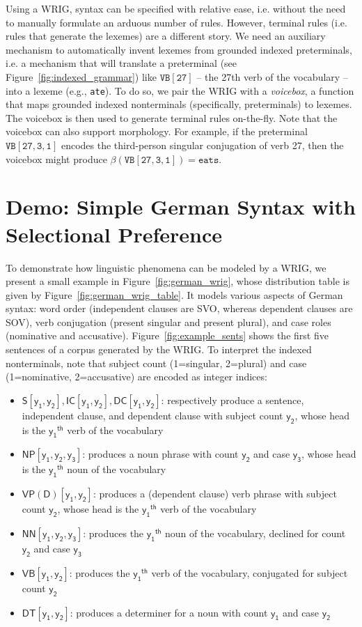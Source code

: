 \documentclass[11pt]{article}
\renewcommand{\bnfpn}[1]{\mathsf{#1}}
\renewcommand{\bnfts}[1]{\mathtt{#1}}
\begin{document}
Using a WRIG, syntax can be specified with relative ease, i.e. without the need to manually formulate an arduous number of rules. However, terminal rules (i.e. rules that generate the lexemes) are a different story. We need an auxiliary mechanism to automatically invent lexemes from grounded indexed preterminals, i.e. a mechanism that will translate a preterminal (see Figure~\ref{fig:indexed_grammar}) like $\bnfts{VB[27]}$ -- the 27th verb of the vocabulary -- into a lexeme (e.g., \texttt{ate}). To do so, we pair the WRIG with a \emph{voicebox}, a function that maps grounded indexed nonterminals (specifically, preterminals) to lexemes. The voicebox is then used to generate terminal rules on-the-fly. Note that the voicebox can also support morphology. For example, if the preterminal $\bnfts{VB[27, 3, 1]}$ encodes the third-person singular conjugation of verb 27, then the voicebox might produce $\beta(\bnfts{VB[27, 3, 1]}) = \texttt{eats}$.


\section{Demo: Simple German Syntax with Selectional Preference}

To demonstrate how linguistic phenomena can be modeled by a WRIG, we present a small example in Figure~\ref{fig:german_wrig}, whose distribution table is given by Figure~\ref{fig:german_wrig_table}. It models various aspects of German syntax: word order (independent clauses are SVO, whereas dependent clauses are SOV), verb conjugation (present singular and present plural), and case roles (nominative and accusative). Figure~\ref{fig:example_sents} shows the first five sentences of a corpus generated by the WRIG. To interpret the indexed nonterminals, note that subject count (1=singular, 2=plural) and case (1=nominative, 2=accusative) are encoded as integer indices:
\begin{itemize}
	\item $\bnfpn{S[y_1, y_2]}, \bnfpn{IC[y_1, y_2]}, \bnfpn{DC[y_1, y_2]}$: respectively produce a sentence, independent clause, and dependent clause with subject count $\bnfpn{y_2}$, whose head is the $\bnfpn{y_1}^{\mathsf{th}}$ verb of the vocabulary
	\item $\bnfpn{NP[y_1, y_2, y_3]}$: produces a noun phrase with count $\bnfpn{y_2}$ and case $\bnfpn{y_3}$, whose head is the $\bnfpn{y_1}^{\mathsf{th}}$ noun of the vocabulary
	\item $\bnfpn{VP(D)[y_1, y_2]}$: produces a (dependent clause) verb phrase with subject count $\bnfpn{y_2}$, whose head is the $\bnfpn{y_1}^{\mathsf{th}}$ verb of the vocabulary
	\item $\bnfpn{NN[y_1, y_2, y_3]}$: produces the $\bnfpn{y_1}^{\mathsf{th}}$ noun of the vocabulary, declined for count $\bnfpn{y_2}$ and case $\bnfpn{y_3}$
	\item $\bnfpn{VB[y_1, y_2]}$: produces the $\bnfpn{y_1}^{\mathsf{th}}$ verb of the vocabulary, conjugated for subject count $\bnfpn{y_2}$
	\item $\bnfpn{DT[y_1, y_2]}$: produces a determiner for a noun with count $\bnfpn{y_1}$ and case $\bnfpn{y_2}$
\end{itemize}
\end{document}
